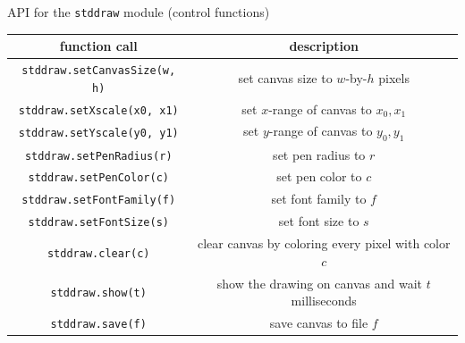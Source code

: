 \documentclass[8pt,a4paper,compress]{beamer}
\begin{document}
\begin{frame}[fragile]
\pause

API for the \lstinline{stddraw} module (control functions)
\begin{center}
\begin{tabular}{cc}
function call & description \\ \hline
\lstinline$stddraw.setCanvasSize(w, h)$ & set canvas size to $w$-by-$h$ pixels \\
\lstinline$stddraw.setXscale(x0, x1)$ & set $x$-range of canvas to $x_0, x_1$ \\
\lstinline$stddraw.setYscale(y0, y1)$ & set $y$-range of canvas to $y_0, y_1$ \\
\lstinline$stddraw.setPenRadius(r)$ & set pen radius to $r$ \\
\lstinline$stddraw.setPenColor(c)$ & set pen color to $c$ \\
\lstinline$stddraw.setFontFamily(f)$ & set font family to $f$ \\
\lstinline$stddraw.setFontSize(s)$ & set font size to $s$ \\
\lstinline$stddraw.clear(c)$ & clear canvas by coloring every pixel with color $c$ \\
\lstinline$stddraw.show(t)$ & show the drawing on canvas and wait $t$ milliseconds \\
\lstinline$stddraw.save(f)$ & save canvas to file $f$ 
\end{tabular} 
\end{center}
\end{frame}
\end{document}
